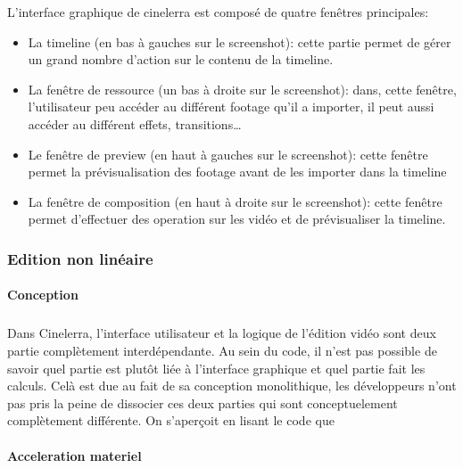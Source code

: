 L'interface graphique de cinelerra est composé de quatre fenêtres
principales:

\begin{itemize}
  \item {La timeline (en bas à gauches sur le screenshot): cette
    partie permet de gérer un grand nombre d'action sur le contenu de
    la timeline.}

  \item {La fenêtre de ressource (un bas à droite sur le screenshot):
    dans, cette fenêtre, l'utilisateur peu accéder au différent
    footage qu'il a importer, il peut aussi accéder au différent effets,
    transitions\ldots}

  \item {Le fenêtre de preview (en haut à gauches sur le screenshot):
    cette fenêtre permet la prévisualisation des footage avant de les
    importer dans la timeline}

  \item {La fenêtre de composition (en haut à droite sur le screenshot):
    cette fenêtre permet d'effectuer des operation sur les vidéo et
    de prévisualiser la timeline.}

\end{itemize}

\subsubsection{Edition non linéaire}

\paragraph{Conception}

\subparagraph{}

Dans Cinelerra, l'interface utilisateur et la logique de l'édition
vidéo sont deux partie complètement interdépendante. Au sein du
code, il n'est pas possible de savoir quel partie est plutôt liée à
l'interface graphique et quel partie fait les calculs. Celà est due au
fait de sa conception monolithique, les développeurs n'ont pas pris la
peine de dissocier ces deux parties qui sont conceptuelement complètement
différente. On s'aperçoit en lisant le code que

\paragraph{Acceleration materiel}

\subparagraph{}

